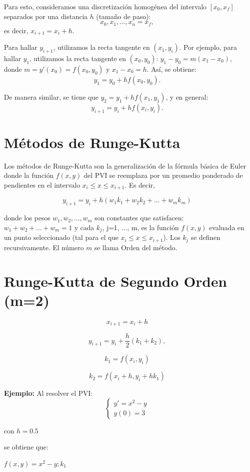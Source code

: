 \documentclass[12pt,letterpaper]{article}
\begin{document}
Para esto, consideramos una discretización homogénea del intervalo \([x_0, x_f]\) separados por una distancia \(h\) (tamaño de paso):
\[
x_0, x_1, \ldots, x_n = x_f,
\]
es decir, \(x_{i+1} = x_i + h\).

Para hallar \(y_{i+1}\), utilizamos la recta tangente en \((x_1, y_i)\). Por ejemplo, para hallar \(y_1\), utilizamos la recta tangente en \((x_0, y_0)\): \(y_1 - y_0 = m(x_1 - x_0)\), donde \(m = y'(x_0) = f(x_0, y_0)\) y \(x_1 - x_0 = h\). Así, se obtiene:
\[
y_1 = y_0 + h f(x_0, y_0).
\]

De manera similar, se tiene que \(y_2 = y_1 + h f(x_1, y_1)\), y en general:
\[
y_{i+1} = y_i + h f(x_i, y_i).
\]
\section{Métodos de Runge-Kutta}

Los métodos de Runge-Kutta son la generalización de la fórmula básica de Euler donde la función $f(x,y)$ del PVI se reemplaza por un promedio ponderado de pendientes en el intervalo $x_i \leq x \leq x_{i+1}$. Es decir,

\[
y_{i+1} = y_i + h(w_1k_1 + w_2k_2 + \ldots + w_mk_m)
\]

donde los pesos $w_1, w_2, \ldots, w_m$ son constantes que satisfacen: $w_1 + w_2 + \ldots + w_m = 1$ y cada $k_j$, j=1, ..., m, es la función $f(x,y)$ evaluada en un punto seleccionado (tal para el que $x_i \leq x \leq x_{i+1}$). Los $k_j$ se definen recursivamente. El número $m$ se llama Orden del método.

\section*{Runge-Kutta de Segundo Orden (m=2)}


\[
x_{i+1} = x_i + h
\]

\[
y_{i+1} = y_i + \frac{h}{2}(k_1 + k_2),
\]

\[
k_1 = f(x_i, y_i)
\]

\[
k_2 = f(x_i + h, y_i + hk_1)
\]

\textbf{Ejemplo:} Al resolver el PVI:
\[
\begin{cases}
y' = x^2 - y \\
 y(0) = 3
\end{cases}
\]

con \( h = 0.5 \)

se obtiene que:

\( f(x,y) = x^2 - y; k_1 \)
\end{document}
